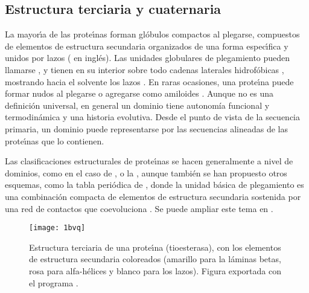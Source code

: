 \subsection{Estructura terciaria y cuaternaria} \label{estr34}

La mayor\'\i{}a de las prote\'\i{}nas forman gl\'{o}bulos compactos al plegarse, compuestos de 
elementos de estructura secundaria organizados de una forma espec\'\i{}fica y unidos por lazos ( en ingl\'{e}s).
Las unidades globulares de plegamiento pueden llamarse 
 \citep{Porter2012}, 
y tienen en su interior sobre todo cadenas laterales hidrof\'{o}bicas \citep{Isom2010}, 
mostrando hacia el solvente los lazos \citep{Branden1999}. 
En raras ocasiones, una prote\'\i{}na puede formar nudos al plegarse \citep{Potestio2010,King2010} o 
agregarse como amiloides \citep{Schnabel2010}. 
Aunque no es una definici\'{o}n universal, en general un dominio tiene autonom\'{i}a funcional y termodin\'{a}mica y una historia evolutiva.
Desde el punto de vista de la secuencia primaria, un dominio puede representarse por las secuencias alineadas de las
prote\'\i{}nas que lo contienen.


Las clasificaciones estructurales de prote\'\i{}nas se hacen generalmente a nivel de dominios, como en el caso de
,  o
la ,
aunque tambi\'{e}n se han propuesto otros esquemas, como la tabla peri\'{o}dica de \cite{Taylor2002}, donde 
la unidad b\'{a}sica de plegamiento es una combinaci\'{o}n compacta de elementos de estructura secundaria 
sostenida por una red de contactos que coevoluciona \citep{Mackenzie2017,Granata2017}. 
Se puede ampliar este tema en \citet{pascual_garcia_alberto_2014_1066350}.

\begin{figure}
\begin{center} 
\texttt{[image: 1bvq]}
\caption%
{
Estructura terciaria de una prote\'\i{}na (tioesterasa), con los elementos de
estructura secundaria coloreados (amarillo para la l\'{a}minas betas, rosa para alfa-h\'{e}lices y blanco para los lazos). 
Figura exportada con el programa .
}
\label{fig:1bvq}
\end{center}
\end{figure}

